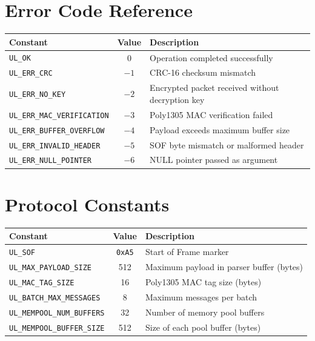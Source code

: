 \documentclass[11pt,a4paper]{article}
\begin{document}
\appendix
\section{Error Code Reference}

\begin{table}[H]
\centering
\begin{tabular}{@{}lcl@{}}
\toprule
\textbf{Constant} & \textbf{Value} & \textbf{Description} \\
\midrule
\texttt{UL\_OK}                    &  0 & Operation completed successfully \\
\texttt{UL\_ERR\_CRC}              & $-1$ & CRC-16 checksum mismatch \\
\texttt{UL\_ERR\_NO\_KEY}          & $-2$ & Encrypted packet received without decryption key \\
\texttt{UL\_ERR\_MAC\_VERIFICATION} & $-3$ & Poly1305 MAC verification failed \\
\texttt{UL\_ERR\_BUFFER\_OVERFLOW} & $-4$ & Payload exceeds maximum buffer size \\
\texttt{UL\_ERR\_INVALID\_HEADER}  & $-5$ & SOF byte mismatch or malformed header \\
\texttt{UL\_ERR\_NULL\_POINTER}    & $-6$ & NULL pointer passed as argument \\
\bottomrule
\end{tabular}
\end{table}

\section{Protocol Constants}

\begin{table}[H]
\centering
\begin{tabular}{@{}lcl@{}}
\toprule
\textbf{Constant} & \textbf{Value} & \textbf{Description} \\
\midrule
\texttt{UL\_SOF}              & \texttt{0xA5} & Start of Frame marker \\
\texttt{UL\_MAX\_PAYLOAD\_SIZE} & 512          & Maximum payload in parser buffer (bytes) \\
\texttt{UL\_MAC\_TAG\_SIZE}    & 16            & Poly1305 MAC tag size (bytes) \\
\texttt{UL\_BATCH\_MAX\_MESSAGES} & 8          & Maximum messages per batch \\
\texttt{UL\_MEMPOOL\_NUM\_BUFFERS} & 32        & Number of memory pool buffers \\
\texttt{UL\_MEMPOOL\_BUFFER\_SIZE} & 512       & Size of each pool buffer (bytes) \\
\bottomrule
\end{tabular}
\end{table}
\end{document}
